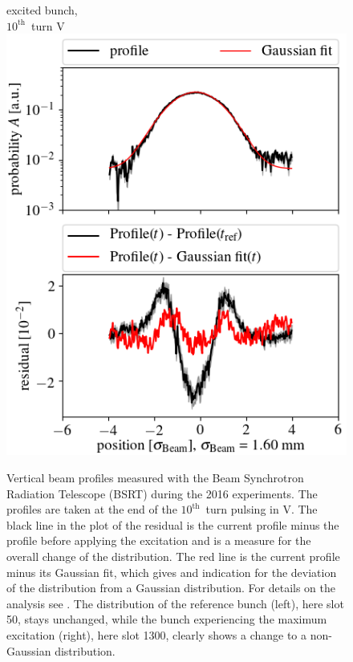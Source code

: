 \documentclass[%
 reprint,
 amsmath,amssymb,
 aps,
prstab,
]{revtex4-1}
\begin{document}
\begin{figure}[h]
\begin{minipage}[t]{0.49\linewidth}
		excited bunch,\\ $10^{\mathrm{th}}$~turn V		\includegraphics[width=1.0\linewidth]{profile_v_10thv_slot_1300.png}
	\end{minipage}
	\caption{\label{fig:10thexpprof} Vertical beam profiles measured with the Beam Synchrotron Radiation Telescope (BSRT) during the 2016 experiments. The profiles are taken at the end of the $10^{\mathrm{th}}$~turn pulsing in V. The black line in the plot of the residual is the current profile minus the profile before applying the excitation and is a measure for the overall change of the distribution. The red line is the current profile minus its Gaussian fit, which gives and indication for the deviation of the distribution from a Gaussian distribution. For details on the analysis see \cite{bsrtprofinj}. The distribution of the reference bunch (left), here slot 50, stays unchanged, while the bunch experiencing the maximum excitation (right), here slot 1300, clearly shows a change to a non-Gaussian distribution.}
\end{figure}
\end{document}

